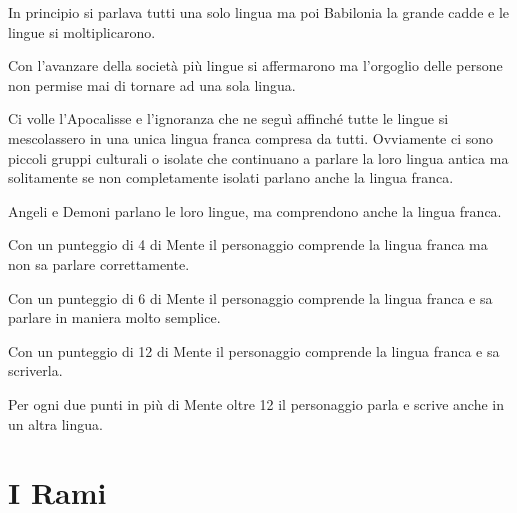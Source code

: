 \documentclass[12pt,a4paper,twoside,openany]{book}
\begin{document}
\begin{multicols}{2}


In principio si parlava tutti una solo lingua ma poi Babilonia la grande cadde e le lingue si moltiplicarono.

Con l'avanzare della società più lingue si affermarono ma l'orgoglio delle persone non permise mai di tornare ad una sola lingua.

Ci volle l'Apocalisse e l'ignoranza che ne seguì affinché tutte le lingue si mescolassero in una unica lingua franca  compresa da tutti. Ovviamente ci sono piccoli gruppi culturali o isolate che continuano a parlare la loro lingua antica ma solitamente se non completamente isolati parlano anche la lingua franca.

Angeli e Demoni parlano le loro lingue, ma comprendono anche la lingua franca.

Con un punteggio di 4 di Mente il personaggio comprende la lingua franca ma non sa parlare correttamente.

Con un punteggio di 6 di Mente il personaggio comprende la lingua franca e sa parlare in maniera molto semplice.

Con un punteggio di 12 di Mente il personaggio comprende la lingua franca e sa scriverla.

Per ogni due punti in più di Mente oltre 12 il personaggio parla e scrive anche in un altra lingua.
\end{multicols}

\pagebreak


\section{I Rami}
\end{document}
